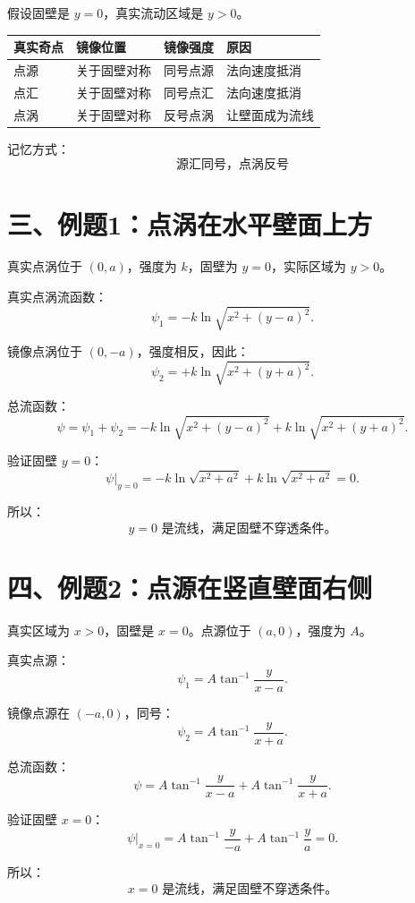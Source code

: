 \documentclass[11pt,a4paper]{ctexart}
\begin{document}
假设固壁是 $y=0$，真实流动区域是 $y>0$。

\begin{center}
\begin{tabular}{llll}
\toprule
真实奇点 & 镜像位置 & 镜像强度 & 原因\\
\midrule
点源 & 关于固壁对称 & 同号点源 & 法向速度抵消\\
点汇 & 关于固壁对称 & 同号点汇 & 法向速度抵消\\
点涡 & 关于固壁对称 & 反号点涡 & 让壁面成为流线\\
\bottomrule
\end{tabular}
\end{center}

记忆方式：
\[
\boxed{\text{源汇同号，点涡反号}}
\]

\section*{三、例题1：点涡在水平壁面上方}

真实点涡位于 $(0,a)$，强度为 $k$，固壁为 $y=0$，实际区域为 $y>0$。

真实点涡流函数：
\[
\psi_1=-k\ln\sqrt{x^2+(y-a)^2}.
\]

镜像点涡位于 $(0,-a)$，强度相反，因此：
\[
\psi_2=+k\ln\sqrt{x^2+(y+a)^2}.
\]

总流函数：
\[
\psi=\psi_1+\psi_2
=-k\ln\sqrt{x^2+(y-a)^2}
+k\ln\sqrt{x^2+(y+a)^2}.
\]

验证固壁 $y=0$：
\[
\psi\big|_{y=0}
=-k\ln\sqrt{x^2+a^2}
+k\ln\sqrt{x^2+a^2}
=0.
\]

所以：
\[
\boxed{y=0\text{ 是流线，满足固壁不穿透条件。}}
\]

\section*{四、例题2：点源在竖直壁面右侧}

真实区域为 $x>0$，固壁是 $x=0$。点源位于 $(a,0)$，强度为 $A$。

真实点源：
\[
\psi_1=A\tan^{-1}\frac{y}{x-a}.
\]

镜像点源在 $(-a,0)$，同号：
\[
\psi_2=A\tan^{-1}\frac{y}{x+a}.
\]

总流函数：
\[
\psi
=A\tan^{-1}\frac{y}{x-a}
+A\tan^{-1}\frac{y}{x+a}.
\]

验证固壁 $x=0$：
\[
\psi\big|_{x=0}
=A\tan^{-1}\frac{y}{-a}
+A\tan^{-1}\frac{y}{a}
=0.
\]

所以：
\[
\boxed{x=0\text{ 是流线，满足固壁不穿透条件。}}
\]
\end{document}
